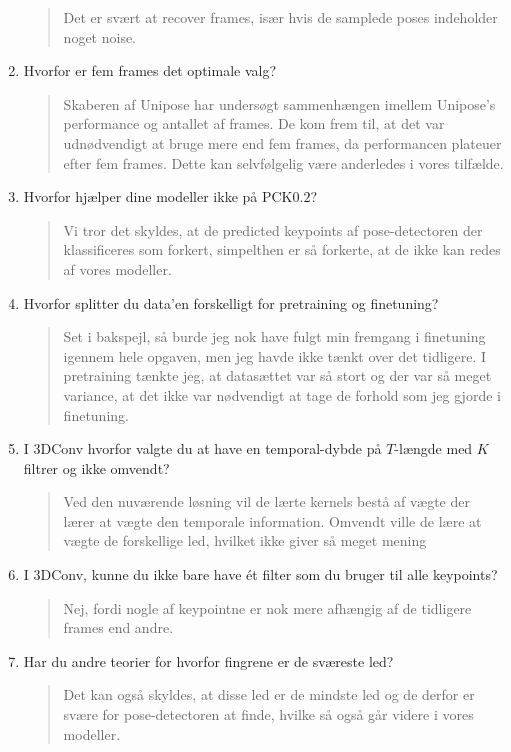 \documentclass[a4paper]{report}
\begin{document}
\begin{enumerate}
    \begin{quote}
        Det er svært at recover frames, især hvis de samplede poses indeholder noget noise. 
    \end{quote}
    \item Hvorfor er fem frames det optimale valg? 
    \begin{quote}
        Skaberen af Unipose har undersøgt sammenhængen imellem Unipose's performance og antallet af frames. De kom frem til, at det var udnødvendigt at bruge mere end fem frames, da performancen plateuer efter fem frames. Dette kan selvfølgelig være anderledes i vores tilfælde.
    \end{quote}
    \item Hvorfor hjælper dine modeller ikke på PCK$0.2$?
    \begin{quote}
        Vi tror det skyldes, at de predicted keypoints af pose-detectoren der klassificeres som forkert, simpelthen er så forkerte, at de ikke kan redes af vores modeller.
    \end{quote}
    \item Hvorfor splitter du data'en forskelligt for pretraining og finetuning?
    \begin{quote}
        Set i bakspejl, så burde jeg nok have fulgt min fremgang i finetuning igennem hele opgaven, men jeg havde ikke tænkt over det tidligere. I pretraining tænkte jeg, at datasættet var så stort og der var så meget variance, at det ikke var nødvendigt at tage de forhold som jeg gjorde i finetuning.
    \end{quote}
    \item I 3DConv hvorfor valgte du at have en temporal-dybde på $T$-længde med $K$ filtrer og ikke omvendt?
    \begin{quote}
        Ved den nuværende løsning vil de lærte kernels bestå af vægte der lærer at vægte den temporale information. Omvendt ville de lære at vægte de forskellige led, hvilket ikke giver så meget mening
    \end{quote}
    \item I 3DConv, kunne du ikke bare have ét filter som du bruger til alle keypoints?
    \begin{quote}
        Nej, fordi nogle af keypointne er nok mere afhængig af de tidligere frames end andre.
    \end{quote}
    \item Har du andre teorier for hvorfor fingrene er de sværeste led?
    \begin{quote}
        Det kan også skyldes, at disse led er de mindste led og de derfor er svære for pose-detectoren at finde, hvilke så også går videre i vores modeller.
    \end{quote}
\end{enumerate}
\end{document}
